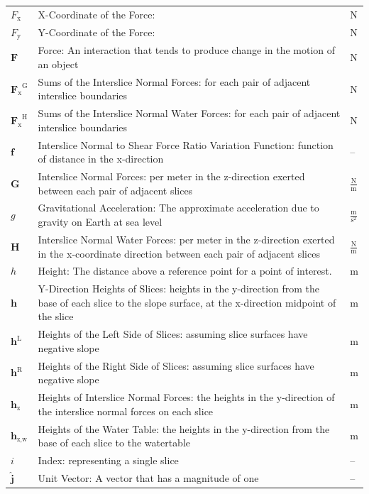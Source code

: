 \documentclass[12pt]{article}
\begin{document}
\begin{longtabu}{l X[l] l}
${F_{\text{x}}}$ & X-Coordinate of the Force:  & N
\\
${F_{\text{y}}}$ & Y-Coordinate of the Force:  & N
\\
$\mathbf{F}$ & Force: An interaction that tends to produce change in the motion of an object & N
\\
${{\mathbf{F}_{\text{x}}}^{\text{G}}}$ & Sums of the Interslice Normal Forces: for each pair of adjacent interslice boundaries & N
\\
${{\mathbf{F}_{\text{x}}}^{\text{H}}}$ & Sums of the Interslice Normal Water Forces: for each pair of adjacent interslice boundaries & N
\\
$\mathbf{f}$ & Interslice Normal to Shear Force Ratio Variation Function: function of distance in the x-direction & --
\\
$\mathbf{G}$ & Interslice Normal Forces: per meter in the z-direction exerted between each pair of adjacent slices & $\frac{\text{N}}{\text{m}}$
\\
$g$ & Gravitational Acceleration: The approximate acceleration due to gravity on Earth at sea level & $\frac{\text{m}}{\text{s}^{2}}$
\\
$\mathbf{H}$ & Interslice Normal Water Forces: per meter in the z-direction exerted in the x-coordinate direction between each pair of adjacent slices & $\frac{\text{N}}{\text{m}}$
\\
$h$ & Height: The distance above a reference point for a point of interest. & m
\\
$\mathbf{h}$ & Y-Direction Heights of Slices: heights in the y-direction from the base of each slice to the slope surface, at the x-direction midpoint of the slice & m
\\
${\mathbf{h}^{\text{L}}}$ & Heights of the Left Side of Slices: assuming slice surfaces have negative slope & m
\\
${\mathbf{h}^{\text{R}}}$ & Heights of the Right Side of Slices: assuming slice surfaces have negative slope & m
\\
${\mathbf{h}_{\text{z}}}$ & Heights of Interslice Normal Forces: the heights in the y-direction of the interslice normal forces on each slice & m
\\
${\mathbf{h}_{\text{z,w}}}$ & Heights of the Water Table: the heights in the y-direction from the base of each slice to the watertable & m
\\
$i$ & Index: representing a single slice & --
\\
$\mathbf{\hat{j}}$ & Unit Vector: A vector that has a magnitude of one & --

\end{longtabu}
\end{document}
